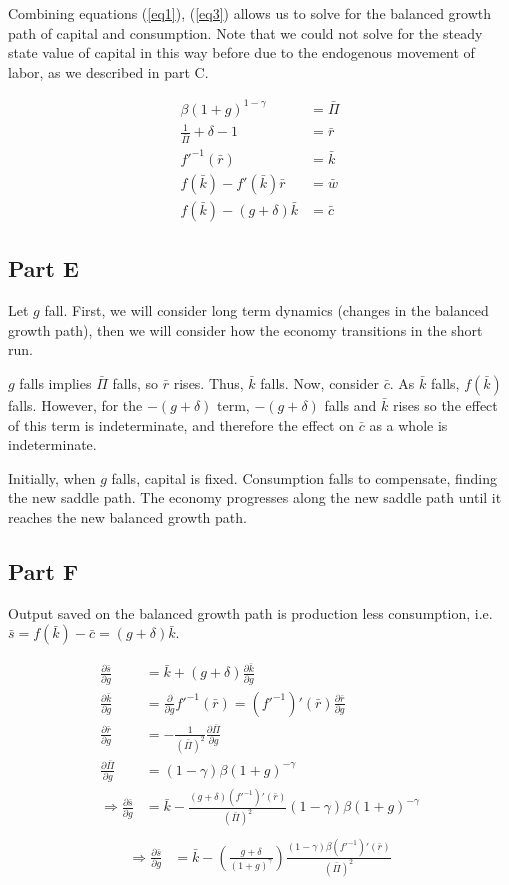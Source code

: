 \documentclass[11pt]{article} %
\begin{document}
Combining equations  (\ref{eq1}), (\ref{eq3}) allows us to solve for the balanced growth path of capital and consumption. Note that we could not solve for the steady state value of capital in this way before due to the endogenous movement of labor, as we described in part C.

\begin{align*}
\beta(1+g)^{1-\gamma} &= \bar{\Pi}\\
\frac{1}{\bar{\Pi}} + \delta - 1 &= \bar{r} \\
 f'^{-1}(\bar{r}) &= \bar{k} \\
 f(\bar{k})  - f'(\bar{k})\bar{r} &= \bar{w} \\
f(\bar{k}) - (g+\delta) \bar{k} &= \bar{c}
\end{align*}

\subsection{Part E}
Let $g$ fall. First, we will consider long term dynamics (changes in the balanced growth path), then we will consider how the economy transitions in the short run.

$g$ falls implies $\bar{\Pi}$ falls, so $\bar{r}$ rises. Thus, $\bar{k}$ falls. Now, consider $\bar{c}$. As $\bar{k}$ falls, $f(\bar{k})$ falls. However, for the $-(g+\delta)$ term, $-(g+\delta)$ falls and $\bar{k}$ rises so the effect of this term is indeterminate, and therefore the effect on $\bar{c}$ as a whole is indeterminate.

Initially, when $g$ falls, capital is fixed. Consumption falls to compensate, finding the new saddle path. The economy progresses along the new saddle path until it reaches the new balanced growth path.

\subsection{Part F}
Output saved on the balanced growth path is production less consumption, i.e. $\bar{s} = f(\bar{k}) - \bar{c} = (g+\delta) \bar{k}$. 

\begin{align*}
\frac{\partial \bar{s}}{\partial g} &= \bar{k} + (g+\delta ) \frac{\partial \bar{k}}{\partial g}\\
 \frac{\partial \bar{k}}{\partial g} &= \frac{\partial }{\partial g} f'^{-1}(\bar{r}) = (f'^{-1})'(\bar{r}) \frac{\partial \bar{r}}{\partial g}\\
\frac{\partial \bar{r}}{\partial g} &= - \frac{1}{(\bar{\Pi})^2} \frac{\partial \bar{\Pi}}{\partial g} \\
\frac{\partial \bar{\Pi}}{\partial g} &= (1-\gamma)\beta (1+g)^{-\gamma} \\
\Rightarrow \frac{\partial \bar{s}}{\partial g} &=  \bar{k} - \frac{ (g+\delta )(f'^{-1})'(\bar{r})}{(\bar{\Pi})^2}(1-\gamma)\beta (1+g)^{-\gamma} \\
\end{align*}
\begin{align}
\Rightarrow \frac{\partial \bar{s}}{\partial g} &=  \bar{k} - \left( \frac{g+\delta}{(1+g)^{\gamma}} \right) \frac{(1-\gamma)\beta (f'^{-1})'(\bar{r})}{(\bar{\Pi})^2}
\end{align}
\end{document}
